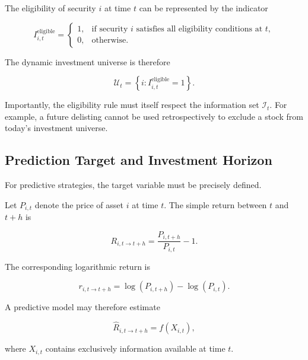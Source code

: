 \documentclass[11pt,a4paper]{article}
\begin{document}
The eligibility of security $i$ at time $t$ can be represented by the indicator

\begin{equation}
I_{i,t}^{\mathrm{eligible}}
=
\begin{cases}
1,
&
\text{if security } i
\text{ satisfies all eligibility conditions at } t,
\\[0.2cm]
0,
&
\text{otherwise}.
\end{cases}
\end{equation}

The dynamic investment universe is therefore

\begin{equation}
\boxed{
\mathcal{U}_t
=
\left\{
i:
I_{i,t}^{\mathrm{eligible}}=1
\right\}.
}
\end{equation}

Importantly, the eligibility rule must itself respect the information set
$\mathcal{I}_t$. For example, a future delisting cannot be used retrospectively
to exclude a stock from today's investment universe.


\subsection{Prediction Target and Investment Horizon}
\label{subsec:prediction_target}

For predictive strategies, the target variable must be precisely defined.

Let $P_{i,t}$ denote the price of asset $i$ at time $t$. The simple return
between $t$ and $t+h$ is

\begin{equation}
R_{i,t\rightarrow t+h}
=
\frac{P_{i,t+h}}{P_{i,t}}-1.
\end{equation}

The corresponding logarithmic return is

\begin{equation}
r_{i,t\rightarrow t+h}
=
\log(P_{i,t+h})
-
\log(P_{i,t}).
\end{equation}

A predictive model may therefore estimate

\begin{equation}
\widehat{R}_{i,t\rightarrow t+h}
=
f(X_{i,t}),
\end{equation}

where $X_{i,t}$ contains exclusively information available at time $t$.
\end{document}
